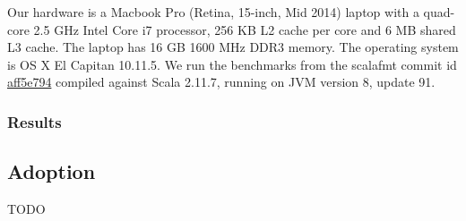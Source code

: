 Our hardware is a Macbook Pro (Retina, 15-inch, Mid 2014) laptop with a quad-core 2.5 GHz Intel Core i7 processor, 256 KB L2 cache per core and 6 MB shared L3 cache.
The laptop has 16 GB 1600 MHz DDR3 memory.
The operating system is OS X El Capitan 10.11.5.
We run the benchmarks from the scalafmt commit id \href{https://github.com/olafurpg/scalafmt/tree/aff5e794dae4787b08243f8abb87a3ca4d907e40}{aff5e794} compiled against Scala 2.11.7, running on JVM version 8, update 91.

\subsubsection{Results}


\subsection{Adoption}\label{sec:adoption}
TODO


